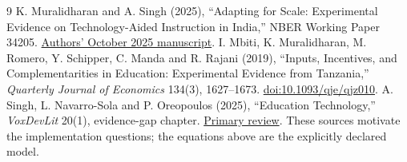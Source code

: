 \documentclass[11pt,a4paper]{article}
\theoremstyle{remark}
\begin{document}
\begin{thebibliography}{9}
 K. Muralidharan and A. Singh (2025), ``Adapting for Scale: Experimental Evidence on Technology-Aided Instruction in India,'' NBER Working Paper 34205. \href{https://cdep.sipa.columbia.edu/sites/cdep.sipa.columbia.edu/files/content/Mindspark_Rajasthan\%20\%287\%20October\%202025\%29.pdf}{Authors' October 2025 manuscript}.
 I. Mbiti, K. Muralidharan, M. Romero, Y. Schipper, C. Manda and R. Rajani (2019), ``Inputs, Incentives, and Complementarities in Education: Experimental Evidence from Tanzania,'' \emph{Quarterly Journal of Economics} 134(3), 1627--1673. \href{https://doi.org/10.1093/qje/qjz010}{doi:10.1093/qje/qjz010}.
 A. Singh, L. Navarro-Sola and P. Oreopoulos (2025), ``Education Technology,'' \emph{VoxDevLit} 20(1), evidence-gap chapter. \href{https://voxdev.org/voxdevlit/education-technology/edtech-evidence-gaps}{Primary review}. These sources motivate the implementation questions; the equations above are the explicitly declared model.
\end{thebibliography}
\end{document}
